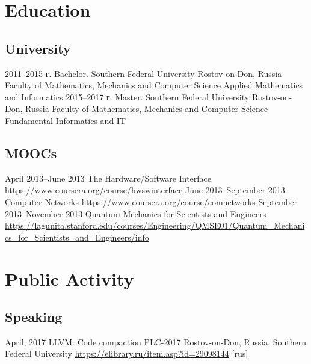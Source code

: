 \documentclass[11pt,a4paper]{moderncv}
\newcommand{\EngRus}[2]{#1}
\newcommand{\BirthPlaceOfValour}{\EngRus{Rostov-on-Don, Russia}{Ростов-на-Дону, Россия}}
\begin{document}
\pagebreak

\section{\EngRus{Education}{Образование}}
  \subsection{\EngRus{University}{Университет}}
    \cventry
      {2011--2015 г.}
      {\EngRus{Bachelor. Southern Federal University}{Бакалавриат. Южный Федеральный Университет}}
      {\BirthPlaceOfValour}
      {\EngRus{Faculty of Mathematics, Mechanics and Computer Science}
      {Институт математики, механики и компьютерных наук им. И.И. Воровича}}
      {\EngRus{Applied Mathematics and Informatics}{Прикладная математика и информатика}}
      {}
    \cventry
      {2015--2017 г.}
      {\EngRus{Master. Southern Federal University}{Магистратура. Южный Федеральный Университет}}
      {\BirthPlaceOfValour}
      {\EngRus{Faculty of Mathematics, Mechanics and Computer Science}
      {Институт математики, механики и компьютерных наук им. И.И. Воровича}}
      {\EngRus{Fundamental Informatics and IT}{Фундаментальная информатика и информационные технологии}}
      {}
  \subsection{\EngRus{MOOCs}{Онлайн курсы}}
    \cventry
      {\EngRus{April}{Апрель} 2013--\EngRus{June}{Июнь} 2013}
      {The Hardware/Software Interface}
      {\newline\url{https://www.coursera.org/course/hwswinterface}}
      {}{}{}
    \cventry
      {\EngRus{June}{Июнь} 2013--\EngRus{September}{Сентябрь} 2013}
      {Computer Networks}
      {\newline\url{https://www.coursera.org/course/comnetworks}}
      {}{}{}
    \cventry
      {\EngRus{September}{Сентябрь} 2013--\EngRus{November}{Ноябрь} 2013}
      {Quantum Mechanics for Scientists and Engineers}
      {\newline\url{https://lagunita.stanford.edu/courses/Engineering/QMSE01/Quantum_Mechanics_for_Scientists_and_Engineers/info}}
      {}{}{}

\section{\EngRus{Public Activity}{Публичная деятельность}}
  \subsection{\EngRus{Speaking}{Конференции}}
    \cventry
      {\EngRus{April}{Апрель}, 2017}
      {\EngRus{LLVM. Code compaction}{Преобразование по уплотнению кода в LLVM}}
      {\EngRus{PLC-2017}{Языки программирования и компиляторы 2017}}
      {\BirthPlaceOfValour, \EngRus{Southern Federal University}{Южный Федеральный Университет}}
      {\newline\url{https://elibrary.ru/item.asp?id=29098144} \EngRus{[rus]}{}}
      {}{}
\end{document}
